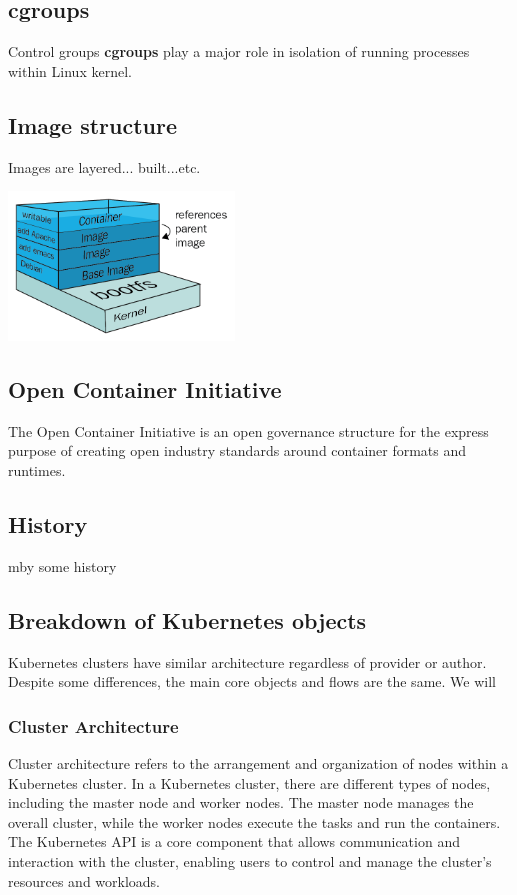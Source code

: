 \documentclass{article}
\begin{document}
\subsection{cgroups}
Control groups \textbf{cgroups} play a major role in isolation of running processes within Linux kernel.  

\subsection{Image structure}
Images are layered... built...etc.
\begin{center}
  \includegraphics[width=0.450\textwidth]{000_Image_structure.png}
\end{center}
\subsection{Open Container Initiative}
The Open Container Initiative is an open governance structure for the express purpose of creating open industry standards around container formats and runtimes.
\subsection{History}
mby some history
\subsection{Breakdown of Kubernetes objects}
Kubernetes clusters have similar architecture regardless of provider or author. Despite some differences, the main core objects and flows are the same. We will  
\subsubsection*{Cluster Architecture}
Cluster architecture refers to the arrangement and organization of nodes within a Kubernetes cluster. In a Kubernetes cluster, there are different types of nodes, including the master node and worker nodes. The master node manages the overall cluster, while the worker nodes execute the tasks and run the containers. The Kubernetes API is a core component that allows communication and interaction with the cluster, enabling users to control and manage the cluster's resources and workloads.
\end{document}

